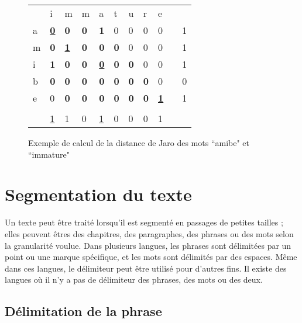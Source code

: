 \documentclass{KodeBook}
\begin{document}
\begin{figure}[!ht]
\begin{minipage}{0.45\textwidth}
\begin{tabular}{|l|l|l|l|l|l|l|l|l|l|l|}
	\cline{1-9}
	  & i & m & m & a & t & u & r & e & \multicolumn{2}{l}{ }\\
	\cline{1-9}\cline{11-11}
	a & \underline{\textbf{0}} & \textbf{0} & \textbf{0} & \textbf{1} & 0 & 0 & 0 & 0 & & 1\\
	\cline{1-9}\cline{11-11}
	m & \textbf{0} & \underline{\textbf{1}} & \textbf{0} & \textbf{0} & \textbf{0} & 0 & 0 & 0 & & 1\\
	\cline{1-9}\cline{11-11}
	i & \textbf{1} & \textbf{0} & \textbf{0} & \underline{\textbf{0}} & \textbf{0} & \textbf{0} & 0 & 0 & & 1\\
	\cline{1-9}\cline{11-11}
	b & \textbf{0} & \textbf{0} & \textbf{0} & \textbf{0} & \textbf{0} & \textbf{0} & \textbf{0} & 0 & & 0\\
	\cline{1-9}\cline{11-11}
	e & 0 & \textbf{0} & \textbf{0} & \textbf{0} & \textbf{0} & \textbf{0} & \textbf{0} & \underline{\textbf{1}} & & 1\\
	\cline{1-9}\cline{11-11}
	\multicolumn{11}{l}{ }\\
	\cline{2-9}
	\multicolumn{1}{l|}{} & \underline{1} & 1 & 0 & \underline{1} & 0 & 0 & 0 & 1 & \multicolumn{2}{l}{ }\\
	\cline{2-9}
\end{tabular}
\end{minipage}
\caption[Exemple de calcul de la distance de Jaro]{Exemple de calcul de la distance de Jaro des mots ``amibe"  et ``immature" \label{fig:jaro}}
\end{figure}

\section{Segmentation du texte}

Un texte peut être traité lorsqu'il est segmenté en passages de petites tailles ; elles peuvent êtres des chapitres, des paragraphes, des phrases ou des mots selon la granularité voulue.
Dans plusieurs langues, les phrases sont délimitées par un point ou une marque spécifique, et les mots sont délimités par des espaces. 
Même dans ces langues, le délimiteur peut être utilisé pour d'autres fins. 
Il existe des langues où il n'y a pas de délimiteur des phrases, des mots ou des deux.

\subsection{Délimitation de la phrase}
\end{document}
